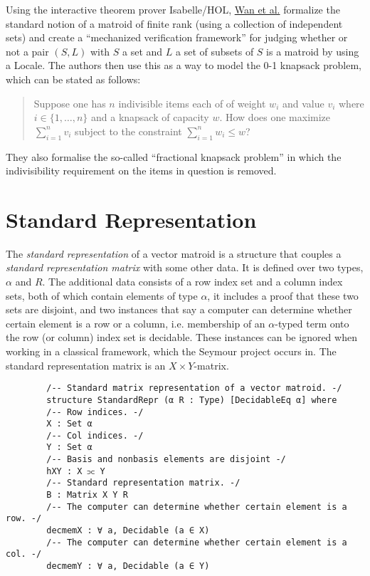 \documentclass[sigplan,10pt,anonymous,review]{acmart}
\begin{document}
	Using the interactive theorem prover Isabelle/HOL, \href{https://link.springer.com/chapter/10.1007/978-981-96-1621-3_18}{Wan et al.}
	formalize the standard notion of a matroid of finite rank (using a collection of independent sets) and create a ``mechanized verification framework''
	for judging whether or not a pair $(S, L)$ with $S$ a set and $L$ a set of subsets of $S$ is a matroid by using a Locale. The authors then use
	this as a way to model the 0-1 knapsack problem, which can be stated as follows:
	\begin{quote}
		Suppose one has $n$ indivisible items each of of weight $w_i$ and value $v_i$ where $i \in \{1,\ldots, n\}$ and a knapsack of capacity $w$.
		How does one maximize $\sum_{i=1}^n v_i$ subject to the constraint $\sum_{i=1}^n w_i \le w$?
	\end{quote}
	They also formalise the so-called ``fractional knapsack problem'' in which the indivisibility requirement on the items in question is removed.

	\section{Standard Representation}
	The \emph{standard representation} of a vector matroid is a structure that couples a \emph{standard representation matrix} with some other data. It is defined over two types, $\alpha$ and $R$. The additional data consists of a row index set and a column index sets, both of which contain elements of type $\alpha$, it includes a proof that these two sets are disjoint, and two instances that say a computer can determine whether certain element is a row or a column, i.e. membership of an $\alpha$-typed term onto the row (or column) index set is decidable. These instances can be ignored when working in a classical framework, which the Seymour project occurs in. The standard representation matrix is an $X \times Y$-matrix.

	\begin{lstlisting}
		/-- Standard matrix representation of a vector matroid. -/
		structure StandardRepr (α R : Type) [DecidableEq α] where
		/-- Row indices. -/
		X : Set α
		/-- Col indices. -/
		Y : Set α
		/-- Basis and nonbasis elements are disjoint -/
		hXY : X ⫗ Y
		/-- Standard representation matrix. -/
		B : Matrix X Y R
		/-- The computer can determine whether certain element is a row. -/
		decmemX : ∀ a, Decidable (a ∈ X)
		/-- The computer can determine whether certain element is a col. -/
		decmemY : ∀ a, Decidable (a ∈ Y)
	\end{lstlisting}
\end{document}
